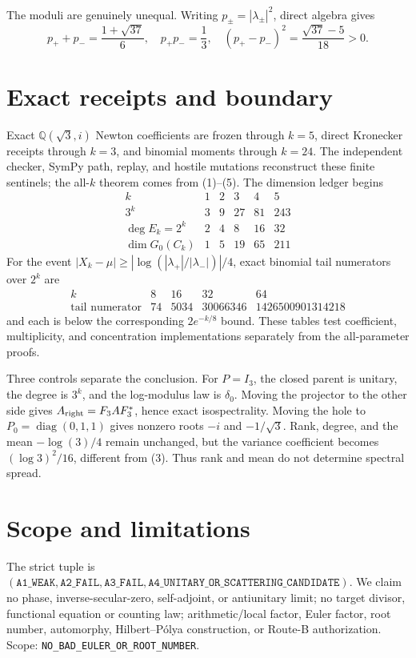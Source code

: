 \documentclass[10pt]{article}
\begin{document}
The moduli are genuinely unequal.  Writing
$p_\pm=|\lambda_\pm|^2$, direct algebra gives
\[
p_++p_-=\frac{1+\sqrt{37}}6,\quad p_+p_-=\frac13,\quad
(p_+-p_-)^2=\frac{\sqrt{37}-5}{18}>0.
\]

\section{Exact receipts and boundary}
Exact $\mathbb Q(\sqrt3,i)$ Newton coefficients are frozen through $k=5$,
direct Kronecker receipts through $k=3$, and binomial moments through $k=24$.
The independent checker, SymPy path, replay, and hostile mutations reconstruct
these finite sentinels; the all-$k$ theorem comes from (1)--(5).
The dimension ledger begins
\[
\begin{array}{c|rrrrr}
k&1&2&3&4&5\\ \hline
3^k&3&9&27&81&243\\
\deg E_k=2^k&2&4&8&16&32\\
\dim G_0(C_k)&1&5&19&65&211
\end{array}
\]
For the event
$|X_k-\mu|\geq|\log(|\lambda_+|/|\lambda_-|)|/4$, exact binomial tail
numerators over $2^k$ are
\[
\begin{array}{c|rrrr}
k&8&16&32&64\\ \hline
\text{tail numerator}&74&5034&30066346&1426500901314218
\end{array}
\]
and each is below the corresponding $2e^{-k/8}$ bound.  These tables test
coefficient, multiplicity, and concentration implementations separately from
the all-parameter proofs.

Three controls separate the conclusion.  For $P=I_3$, the closed parent is
unitary, the degree is $3^k$, and the log-modulus law is $\delta_0$.  Moving
the projector to the other side gives $A_{\rm right}=F_3AF_3^*$, hence exact
isospectrality.  Moving the hole to $P_0=\operatorname{diag}(0,1,1)$ gives
nonzero roots $-i$ and $-1/\sqrt3$.  Rank, degree, and the mean
$-\log(3)/4$ remain unchanged, but the variance coefficient becomes
$(\log3)^2/16$, different from (3).  Thus rank and mean do not determine
spectral spread.

\section{Scope and limitations}
The strict tuple is
$(\texttt{A1\_WEAK},\texttt{A2\_FAIL},\texttt{A3\_FAIL},
\texttt{A4\_UNITARY\_OR\_SCATTERING\_CANDIDATE})$.  We claim no phase,
inverse-secular-zero, self-adjoint, or antiunitary limit; no target divisor,
functional equation or counting law;
arithmetic/local factor, Euler factor, root number, automorphy,
Hilbert--P\'olya construction, or Route-B authorization.  Scope:
\texttt{NO\_BAD\_EULER\_OR\_ROOT\_NUMBER}.
\end{document}
